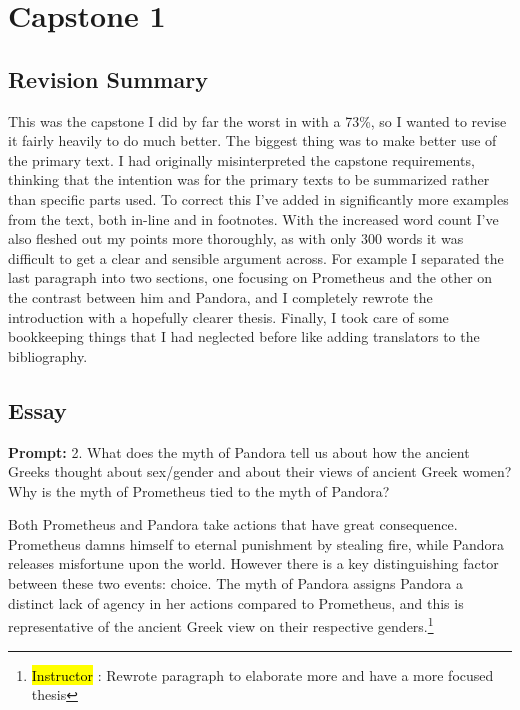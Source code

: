 \documentclass[letterpaper, reqno,11pt]{article}
\newcommand{\hlc}[2][yellow]{{%
    \colorlet{foo}{#1}%
    \sethlcolor{foo}\hl{#2}}%
}
\begin{document}
\pagebreak

\section*{Capstone 1}

\subsection*{Revision Summary}

This was the capstone I did by far the worst in with a 73\%, so I wanted to revise it fairly heavily to do much better. The biggest thing was to make better use of the primary text. I had originally misinterpreted the capstone requirements, thinking that the intention was for the primary texts to be summarized rather than specific parts used. To correct this I've added in significantly more examples from the text, both in-line and in footnotes. With the increased word count I've also fleshed out my points more thoroughly, as with only 300 words it was difficult to get a clear and sensible argument across. For example I separated the last paragraph into two sections, one focusing on Prometheus and the other on the contrast between him and Pandora, and I completely rewrote the introduction with a hopefully clearer thesis. Finally, I took care of some bookkeeping things that I had neglected before like adding translators to the bibliography.


\subsection*{Essay}

{\bf Prompt:} 2. What does the myth of Pandora tell us about how the ancient Greeks thought about sex/gender and about their views of ancient Greek women? Why is the myth of Prometheus tied to the myth of Pandora?  

\medskip

Both Prometheus and Pandora take actions that have great consequence. Prometheus damns himself to eternal punishment by stealing fire, while Pandora releases misfortune upon the world. However there is a key distinguishing factor between these two events: choice. The myth of Pandora assigns Pandora a distinct lack of agency in her actions compared to Prometheus, and this is representative of the ancient Greek view on their respective genders.\footnote{\hlc[Aquamarine]{Instructor}: Rewrote paragraph to elaborate more and have a more focused thesis}
\end{document}
